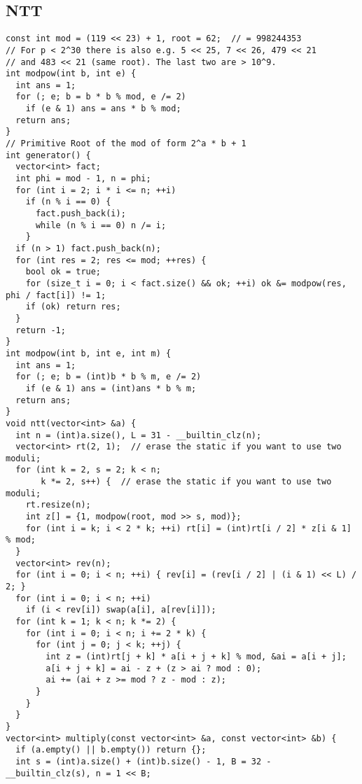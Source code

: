 \documentclass[twoside]{article}
\begin{document}
\begin{multicols*}{2}
\begin{verbatim}
\end{verbatim}

{
\subsection*{NTT}
}
\begin{verbatim}
const int mod = (119 << 23) + 1, root = 62;  // = 998244353
// For p < 2^30 there is also e.g. 5 << 25, 7 << 26, 479 << 21
// and 483 << 21 (same root). The last two are > 10^9.
int modpow(int b, int e) {
  int ans = 1;
  for (; e; b = b * b % mod, e /= 2)
    if (e & 1) ans = ans * b % mod;
  return ans;
}
// Primitive Root of the mod of form 2^a * b + 1
int generator() {
  vector<int> fact;
  int phi = mod - 1, n = phi;
  for (int i = 2; i * i <= n; ++i)
    if (n % i == 0) {
      fact.push_back(i);
      while (n % i == 0) n /= i;
    }
  if (n > 1) fact.push_back(n);
  for (int res = 2; res <= mod; ++res) {
    bool ok = true;
    for (size_t i = 0; i < fact.size() && ok; ++i) ok &= modpow(res, phi / fact[i]) != 1;
    if (ok) return res;
  }
  return -1;
}
int modpow(int b, int e, int m) {
  int ans = 1;
  for (; e; b = (int)b * b % m, e /= 2)
    if (e & 1) ans = (int)ans * b % m;
  return ans;
}
void ntt(vector<int> &a) {
  int n = (int)a.size(), L = 31 - __builtin_clz(n);
  vector<int> rt(2, 1);  // erase the static if you want to use two moduli;
  for (int k = 2, s = 2; k < n;
       k *= 2, s++) {  // erase the static if you want to use two moduli;
    rt.resize(n);
    int z[] = {1, modpow(root, mod >> s, mod)};
    for (int i = k; i < 2 * k; ++i) rt[i] = (int)rt[i / 2] * z[i & 1] % mod;
  }
  vector<int> rev(n);
  for (int i = 0; i < n; ++i) { rev[i] = (rev[i / 2] | (i & 1) << L) / 2; }
  for (int i = 0; i < n; ++i)
    if (i < rev[i]) swap(a[i], a[rev[i]]);
  for (int k = 1; k < n; k *= 2) {
    for (int i = 0; i < n; i += 2 * k) {
      for (int j = 0; j < k; ++j) {
        int z = (int)rt[j + k] * a[i + j + k] % mod, &ai = a[i + j];
        a[i + j + k] = ai - z + (z > ai ? mod : 0);
        ai += (ai + z >= mod ? z - mod : z);
      }
    }
  }
}
vector<int> multiply(const vector<int> &a, const vector<int> &b) {
  if (a.empty() || b.empty()) return {};
  int s = (int)a.size() + (int)b.size() - 1, B = 32 - __builtin_clz(s), n = 1 << B;

\end{verbatim}
\end{multicols*}
\end{document}
